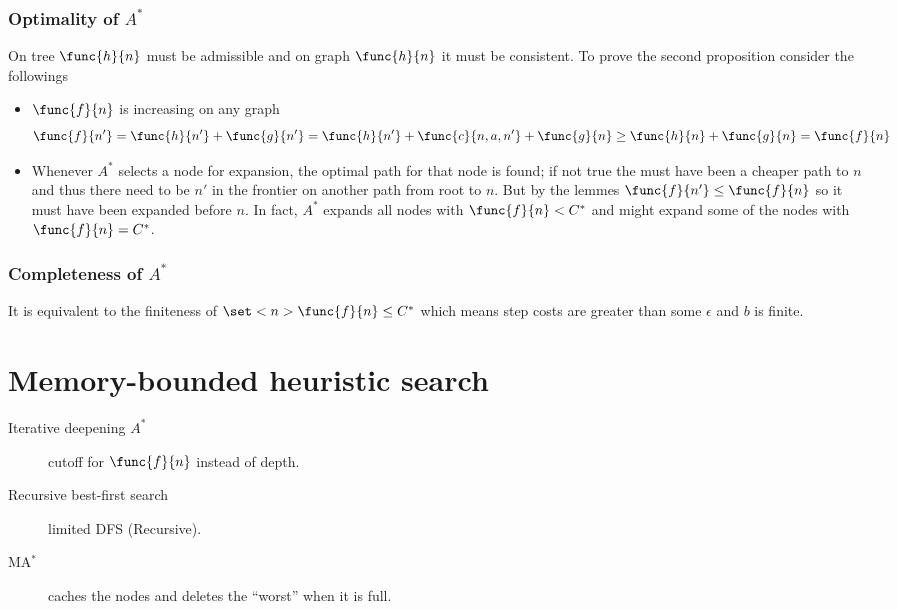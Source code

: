 \subsubsection{Optimality of \(A^{\ast}\)}
On tree \(\func{h}{n}\) must be admissible and on graph \(\func{h}{n}\) it must be consistent. To prove the second proposition consider the followings 
\begin{itemize}
    \item \(\func{f}{n}\) is increasing on any graph 
    \begin{equation*}
        \func{f}{n'} = \func{h}{n'} + \func{g}{n'} = \func{h}{n'} + \func{c}{n,a,n'} + \func{g}{n} \geq \func{h}{n} + \func{g}{n} = \func{f}{n}
    \end{equation*}
    \item Whenever \(A^{\ast}\) selects a node for expansion, the optimal path for that node is found; if not true the must have been a cheaper path to \(n\) and thus there need to be \(n'\) in the frontier on another path from root to \(n\). But by the lemmes \(\func{f}{n'} \leq \func{f}{n}\) so it must have been expanded before \(n\). In fact, \(A^{\ast}\) expands all nodes with \(\func{f}{n} < C^{\ast}\) and might expand some of the nodes with \(\func{f}{n} = C^{\ast}\).
\end{itemize}
\subsubsection{Completeness of \(A^{\ast}\)}
It is equivalent to the finiteness of \(\set<n>{\func{f}{n} \leq C^{\ast}}\) which means step costs are greater than some \(\epsilon\) and \(b\) is finite.
\section{Memory-bounded heuristic search}
\begin{description}
    \item[Iterative deepening \(A^{\ast}\)] cutoff for \(\func{f}{n}\) instead of depth.
    \item[Recursive best-first search] limited DFS (Recursive).
    \item[MA\(^{\ast}\)] caches the nodes and deletes the ``worst'' when it is full.   
\end{description}
